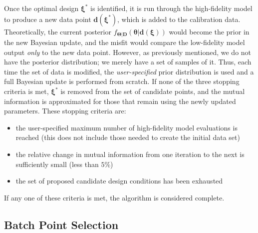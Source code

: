 Once the optimal design $\boldsymbol{\xi}^{*}$ is identified, it is run 
through the high-fidelity model to produce a new data point $\boldsymbol{d}(
\boldsymbol{\xi}^{*})$, which is added to the calibration data. Theoretically,
the current posterior $f_{\boldsymbol{\Theta | D}}\left(\boldsymbol{\theta | 
d(\xi)}\right)$ would become the prior in the new Bayesian update, and the 
misfit would compare the low-fidelity model output \textit{only} to the new
data point. However, as previously mentioned, we do not have the posterior
distribution; we merely have a set of samples of it. Thus, each time the set
of data is modified, the \textit{user-specified} prior distribution is used
and a full Bayesian update is performed from scratch. If none of the three
stopping criteria is met, $\boldsymbol{\xi}^{*}$ is removed from the set of
candidate points, and the mutual information is approximated for those that
remain using the newly updated parameters. These stopping criteria are:
\begin{itemize}
\item the user-specified maximum number of high-fidelity model evaluations is 
reached (this does not include those needed to create the initial 
data set)
\item the relative change in mutual information from one iteration to the next
is sufficiently small (less than $5\%$)
\item the set of proposed candidate design conditions has been exhausted
\end{itemize}
If any one of these criteria is met, the algorithm is considered complete.

\subsection{Batch Point Selection}

